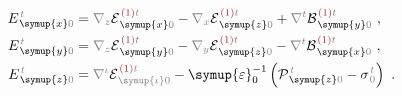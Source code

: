 \begin{subequations} \label{eq:E_0}
\begin{align}
	E^{\;\!\mathcolor{gray}{t}}_{\;\! \symup{x}\mathcolor{gray}{0}} &= \mathcolor{gray}{\nabla_z}
	{\mathcal{E}}^{\;\!\textcolor{Maroon}{(1)}\mathcolor{gray}{t}}_{\;\! \symup{x} \mathcolor{gray}{0}} - \mathcolor{gray}{\nabla_x}
	{\mathcal{E}}^{\;\!\textcolor{Maroon}{(1)}\mathcolor{gray}{t}}_{\;\! \symup{z} \mathcolor{gray}{0}} + \mathcolor{gray}{\nabla^t}
	{\mathcal{B}}^{\;\!\textcolor{Maroon}{(1)}\mathcolor{gray}{t}}_{\;\! \symup{y} \mathcolor{gray}{0}}~, \label{eq:E_x0} \\
	E^{\;\!\mathcolor{gray}{t}}_{\;\! \symup{y}\mathcolor{gray}{0}} &= \mathcolor{gray}{\nabla_z}
	{\mathcal{E}}^{\;\!\textcolor{Maroon}{(1)}\mathcolor{gray}{t}}_{\;\! \symup{y} \mathcolor{gray}{0}} - \mathcolor{gray}{\nabla_y}
	{\mathcal{E}}^{\;\!\textcolor{Maroon}{(1)}\mathcolor{gray}{t}}_{\;\! \symup{z} \mathcolor{gray}{0}} - \mathcolor{gray}{\nabla^t}
	{\mathcal{B}}^{\;\!\textcolor{Maroon}{(1)}\mathcolor{gray}{t}}_{\;\! \symup{x} \mathcolor{gray}{0}}~, \label{eq:E_y0} \\
	E^{\;\!\mathcolor{gray}{t}}_{\;\! \symup{z} \mathcolor{gray}{0}} &= \mathcolor{gray}{\nabla^\iota} 
	{\mathcal{E}}^{\;\!\textcolor{Maroon}{(1)}\mathcolor{gray}{t}}_{\;\! \mathcolor{gray}{\symup{\iota}} \mathcolor{gray}{0}} - {\symup{\varepsilon}}_0^{-1} \left( {\mathcal{P}}^{\;\!\mathcolor{gray}{t}}_{\;\! \symup{z} \mathcolor{gray}{0}} - {\sigma}^{\;\!\mathcolor{gray}{t}}_{\;\! \mathcolor{gray}{0}} \right)~. \label{eq:E_z0}
\end{align}
\end{subequations}

